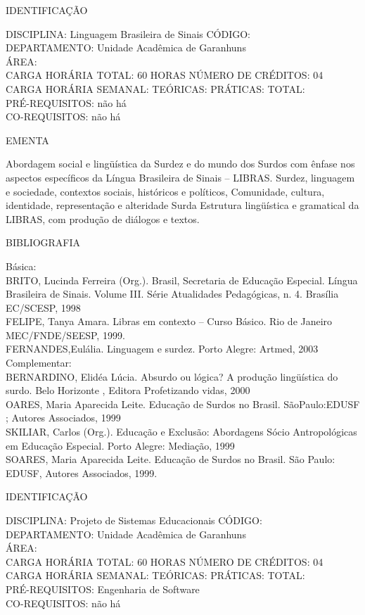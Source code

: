 \documentclass[
	12pt,				%
	openright,			%
  oneside,     %
	a4paper,			%
	english,			%
	french,				%
	spanish,			%
	brazil				%
	]{abntex2}
\begin{document}
\begin{apendicesenv}
\newpage IDENTIFICAÇÃO

DISCIPLINA: Linguagem Brasileira de Sinais CÓDIGO:\\ 
DEPARTAMENTO: Unidade Acadêmica de Garanhuns\\
ÁREA: \\
CARGA HORÁRIA TOTAL: 60 HORAS NÚMERO DE CRÉDITOS: 04\\
CARGA HORÁRIA SEMANAL: TEÓRICAS: PRÁTICAS: TOTAL: \\
PRÉ-REQUISITOS: não há\\
CO-REQUISITOS: não há

EMENTA 

Abordagem social e lingüística da Surdez e do mundo dos Surdos com
ênfase nos aspectos específicos da Língua Brasileira de Sinais --
LIBRAS. Surdez, linguagem e sociedade, contextos sociais, históricos e
políticos, Comunidade, cultura, identidade, representação e alteridade Surda 
Estrutura lingüística e gramatical da LIBRAS, com produção de diálogos e
textos.

BIBLIOGRAFIA 

Básica:\\
BRITO, Lucinda Ferreira (Org.). Brasil, Secretaria de Educação Especial.
Língua Brasileira de Sinais. Volume III. Série Atualidades Pedagógicas,
n. 4. Brasília EC/SCESP, 1998\\
FELIPE, Tanya Amara. Libras em contexto -- Curso Básico. Rio de Janeiro
MEC/FNDE/SEESP, 1999.\\
FERNANDES,Eulália. Linguagem e surdez. Porto Alegre: Artmed, 2003\\
Complementar:\\
BERNARDINO, Elidéa Lúcia. Absurdo ou lógica? A produção lingüística do
surdo. Belo Horizonte , Editora Profetizando vidas, 2000\\
OARES, Maria Aparecida Leite. Educação de Surdos no Brasil.
SãoPaulo:EDUSF ; Autores Associados, 1999\\
SKILIAR, Carlos (Org.). Educação e Exclusão: Abordagens Sócio 
Antropológicas em Educação Especial. Porto Alegre: Mediação, 1999\\
SOARES, Maria Aparecida Leite. Educação de Surdos no Brasil. São Paulo:
EDUSF, Autores Associados, 1999.

\newpage IDENTIFICAÇÃO

DISCIPLINA: Projeto de Sistemas Educacionais CÓDIGO:\\ 
DEPARTAMENTO: Unidade Acadêmica de Garanhuns\\
ÁREA: \\
CARGA HORÁRIA TOTAL: 60 HORAS NÚMERO DE CRÉDITOS: 04\\
CARGA HORÁRIA SEMANAL: TEÓRICAS: PRÁTICAS: TOTAL: \\
PRÉ-REQUISITOS: Engenharia de Software\\
CO-REQUISITOS: não há


\end{apendicesenv}
\end{document}
